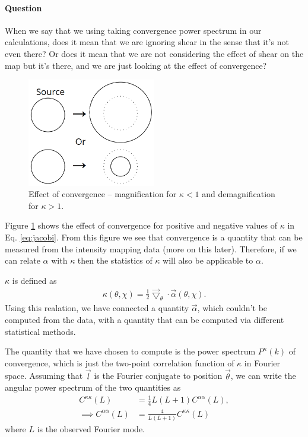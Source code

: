 \documentclass[12pt,a4paper]{article}
\begin{document}
\paragraph{Question} When we say that we using taking convergence power spectrum 
in our calculations, does it mean that we are ignoring shear in the sense that it's not even there? Or does it mean that we are not considering the effect of shear on the map but it's there, and we are just looking at the effect of convergence?

\begin{figure}[tbp]
	\centering
	\includegraphics[width=0.5\textwidth]{convergence}
	\caption{Effect of convergence -- magnification for $ \kappa < 1 $ and demagnification for $ \kappa > 1$.}
	\label{fig:convergence}
\end{figure}

Figure \ref{fig:convergence} shows the effect of convergence for positive and negative values of $ \kappa $ in Eq. \eqref{eq:jacobi}. From this figure we see that convergence is a quantity that can be measured from the intensity mapping data (more on this later). Therefore, if we can relate $ \alpha $  with $ \kappa $ then the statistics of $\kappa$ will also be applicable to $ \alpha $.

$\kappa$ is defined as 
\begin{align}
\kappa(\theta, \chi) = \frac{1}{2} \vec{\bigtriangledown}_\theta \cdot \vec{\alpha}(\theta, \chi).
\end{align}
Using this realation, we have connected a quantity $\vec{\alpha}$, which couldn't be computed from the data, with a quantity that can be computed via different statistical methods.

The quantity that we have chosen to compute is the power spectrum $ P^\kappa(k) $ of convergence, which is just the two-point correlation function of $\kappa$ in Fourier space. Assuming that $ \vec{l} $ is the Fourier conjugate to position $ \vec{\theta} $, we can write the angular power spectrum of the two quantities as 
\begin{align}
C^{\kappa\kappa}(L) &= \frac{1}{4}L(L+1) C^{\alpha\alpha}(L),\\
\implies C^{\alpha\alpha}(L) &= \frac{4}{L(L+1)} C^{\kappa\kappa}(L) \label{eq:disp_field_pow_spec}
\end{align}
where $ L $ is the observed Fourier mode. 
\end{document}
